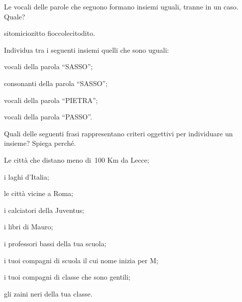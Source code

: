 \begin{esercizio}
\label{ese:5.3}
Le vocali delle parole che seguono formano insiemi uguali, tranne in un caso. 
Quale?
\begin{center}
 \boxA\quad sito\quad\boxB\quad micio\quad\boxC\quad zitto\quad\boxD\quad 
fiocco\quad\boxE\quad lecito\quad\boxF\quad dito.
\end{center}
\end{esercizio}

\begin{esercizio}
\label{ese:5.4}
Individua tra i seguenti insiemi quelli che sono uguali:
\begin{multicols}{2}
\begin{enumeratea}
 \item vocali della parola ``SASSO'';
 \item consonanti della parola ``SASSO'';
 \item vocali della parola ``PIETRA'';
 \item vocali della parola ``PASSO''.
\end{enumeratea}
\end{multicols}
\end{esercizio}

\begin{esercizio}
\label{ese:5.5}
Quali delle seguenti frasi rappresentano criteri oggettivi per individuare un 
insieme? Spiega perché.
\TabPositions{8.5cm}
\begin{enumeratea}
\item Le città che distano meno di~100 Km da Lecce; \tab\boxV\quad\boxF
\item i laghi d'Italia;  \tab\boxV\quad\boxF
\item le città vicine a Roma; \tab\boxV\quad\boxF
\item i calciatori della Juventus;  \tab\boxV\quad\boxF
\item i libri di Mauro;  \tab\boxV\quad\boxF
\item i professori bassi della tua scuola;  \tab\boxV\quad\boxF
\item i tuoi compagni di scuola il cui nome inizia per M; \tab\boxV\quad\boxF
\item i tuoi compagni di classe che sono gentili; \tab\boxV\quad\boxF
\item gli zaini neri della tua classe.  \tab\boxV\quad\boxF
\end{enumeratea}
\end{esercizio}

